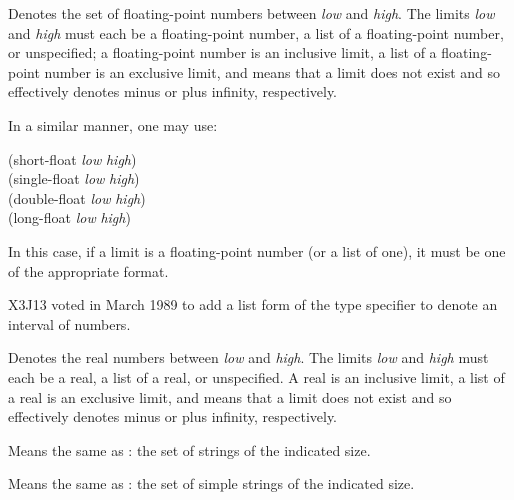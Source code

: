 \begin{flushdesc}
\item[\cd{(float {\it low} {\it high})}]
Denotes the set of floating-point numbers between
{\it low} and {\it high}.  The limits {\it low} and {\it high}
must each be a floating-point number, a list of a floating-point number,
or unspecified; a floating-point number is an inclusive limit, a list of a
floating-point number is an exclusive limit, and
\cd{*} means that a limit does not exist
and so effectively denotes minus or plus infinity, respectively.

In a similar manner, one may use:
\begin{lisp}
(short-float {\it low} {\it high}) \\
(single-float {\it low} {\it high}) \\
(double-float {\it low} {\it high}) \\
(long-float {\it low} {\it high})
\end{lisp}
In this case, if a limit is a floating-point
number (or a list of one), it must be one of the appropriate format.
\end{flushdesc}

\begin{newer}
X3J13 voted in March 1989  to add a list form of the 
type specifier to denote an interval of  numbers.

\begin{flushdesc}
\item[\cd{(real {\it low} {\it high})}]
Denotes the real numbers between
{\it low} and {\it high}.  The limits {\it low} and {\it high}
must each be a real, a list of a real, or unspecified.
A real is an inclusive limit,
a list of a real is an exclusive limit, and
\cd{*} means that a limit does not exist
and so effectively denotes minus or plus infinity, respectively.
\end{flushdesc}
\end{newer}

\begin{obsolete}
\begin{flushdesc}
\item[\cd{(string {\it size})}]
Means the same as
: the set of strings of the indicated size.

\item[\cd{(simple-string {\it size})}]
Means the same
as : the set of simple
strings of the indicated size.
\end{flushdesc}
\end{obsolete}

